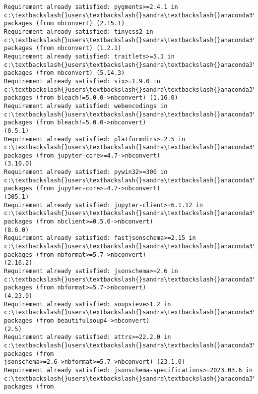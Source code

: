\documentclass[11pt]{article}
\begin{document}
\begin{Verbatim}[commandchars=\\\{\}]
Requirement already satisfied: pygments>=2.4.1 in
c:\textbackslash{}users\textbackslash{}sandra\textbackslash{}anaconda3\textbackslash{}lib\textbackslash{}site-packages (from nbconvert) (2.15.1)
Requirement already satisfied: tinycss2 in c:\textbackslash{}users\textbackslash{}sandra\textbackslash{}anaconda3\textbackslash{}lib\textbackslash{}site-
packages (from nbconvert) (1.2.1)
Requirement already satisfied: traitlets>=5.1 in
c:\textbackslash{}users\textbackslash{}sandra\textbackslash{}anaconda3\textbackslash{}lib\textbackslash{}site-packages (from nbconvert) (5.14.3)
Requirement already satisfied: six>=1.9.0 in c:\textbackslash{}users\textbackslash{}sandra\textbackslash{}anaconda3\textbackslash{}lib\textbackslash{}site-
packages (from bleach!=5.0.0->nbconvert) (1.16.0)
Requirement already satisfied: webencodings in
c:\textbackslash{}users\textbackslash{}sandra\textbackslash{}anaconda3\textbackslash{}lib\textbackslash{}site-packages (from bleach!=5.0.0->nbconvert)
(0.5.1)
Requirement already satisfied: platformdirs>=2.5 in
c:\textbackslash{}users\textbackslash{}sandra\textbackslash{}anaconda3\textbackslash{}lib\textbackslash{}site-packages (from jupyter-core>=4.7->nbconvert)
(3.10.0)
Requirement already satisfied: pywin32>=300 in
c:\textbackslash{}users\textbackslash{}sandra\textbackslash{}anaconda3\textbackslash{}lib\textbackslash{}site-packages (from jupyter-core>=4.7->nbconvert)
(305.1)
Requirement already satisfied: jupyter-client>=6.1.12 in
c:\textbackslash{}users\textbackslash{}sandra\textbackslash{}anaconda3\textbackslash{}lib\textbackslash{}site-packages (from nbclient>=0.5.0->nbconvert)
(8.6.0)
Requirement already satisfied: fastjsonschema>=2.15 in
c:\textbackslash{}users\textbackslash{}sandra\textbackslash{}anaconda3\textbackslash{}lib\textbackslash{}site-packages (from nbformat>=5.7->nbconvert)
(2.16.2)
Requirement already satisfied: jsonschema>=2.6 in
c:\textbackslash{}users\textbackslash{}sandra\textbackslash{}anaconda3\textbackslash{}lib\textbackslash{}site-packages (from nbformat>=5.7->nbconvert)
(4.23.0)
Requirement already satisfied: soupsieve>1.2 in
c:\textbackslash{}users\textbackslash{}sandra\textbackslash{}anaconda3\textbackslash{}lib\textbackslash{}site-packages (from beautifulsoup4->nbconvert)
(2.5)
Requirement already satisfied: attrs>=22.2.0 in
c:\textbackslash{}users\textbackslash{}sandra\textbackslash{}anaconda3\textbackslash{}lib\textbackslash{}site-packages (from
jsonschema>=2.6->nbformat>=5.7->nbconvert) (23.1.0)
Requirement already satisfied: jsonschema-specifications>=2023.03.6 in
c:\textbackslash{}users\textbackslash{}sandra\textbackslash{}anaconda3\textbackslash{}lib\textbackslash{}site-packages (from

\end{Verbatim}
\end{document}
